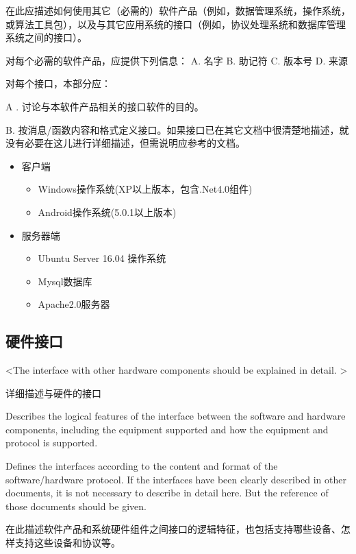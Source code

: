 在此应描述如何使用其它（必需的）软件产品（例如，数据管理系统，操作系统，或算法工具包），以及与其它应用系统的接口（例如，协议处理系统和数据库管理系统之间的接口）。

对每个必需的软件产品，应提供下列信息：
A.	名字
B.	助记符
C.	版本号
D.	来源

对每个接口，本部分应：

A .	讨论与本软件产品相关的接口软件的目的。

B.	按消息/函数内容和格式定义接口。如果接口已在其它文档中很清楚地描述，就没有必要在这儿进行详细描述，但需说明应参考的文档。
\fi
\begin{itemize}
\item 客户端
	\begin{itemize}
	\item Windows操作系统(XP以上版本，包含.Net4.0组件)
	\item Android操作系统(5.0.1以上版本)
	\end{itemize}
\item 服务器端
	\begin{itemize}
	\item Ubuntu Server 16.04 操作系统
	\item Mysql数据库
	\item Apache2.0服务器
	\end{itemize}
\end{itemize}




\subsection{硬件接口}
\iffalse
<The interface with other hardware components should be explained in detail. >

详细描述与硬件的接口

Describes the logical features of the interface between the software and hardware components, including the equipment supported and how the equipment and protocol is supported.

Defines the interfaces according to the content and format of the software/hardware protocol. If the interfaces have been clearly described in other documents, it is not necessary to describe in detail here. But the reference of those documents should be given.

在此描述软件产品和系统硬件组件之间接口的逻辑特征，也包括支持哪些设备、怎样支持这些设备和协议等。

